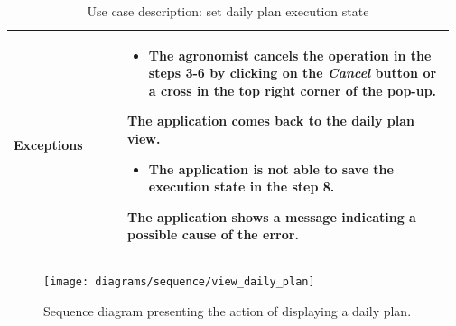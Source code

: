 \begin{table}[H]
\begin{tabular}{@{}p{0.25\linewidth} p{0.72\linewidth}@{}}
		\textbf{Exceptions}         & \begin{itemize}[leftmargin=.4cm,noitemsep,topsep=0pt,before=\vspace{-3mm}]
		   \item The agronomist cancels the operation in the steps 3-6 by clicking on the \textit{Cancel} button or a cross in the top right corner of the pop-up.
		\end{itemize}
		The application comes back to the daily plan view.
	    \begin{itemize}[leftmargin=.4cm,noitemsep,topsep=0pt]
		   \item The application is not able to save the execution state in the step 8. 
		\end{itemize}
		The application shows a message indicating a possible cause of the error.
	    \\\bottomrule
	\end{tabular}
	\caption{Use case description: set daily plan execution state} 
\end{table}

\begin{figure}[H]
    \centering
    \texttt{[image: diagrams/sequence/view\_daily\_plan]}
    \caption{Sequence diagram presenting the action of displaying a daily plan.}
    \label{fig:sd_view_daily_plan}
\end{figure}

